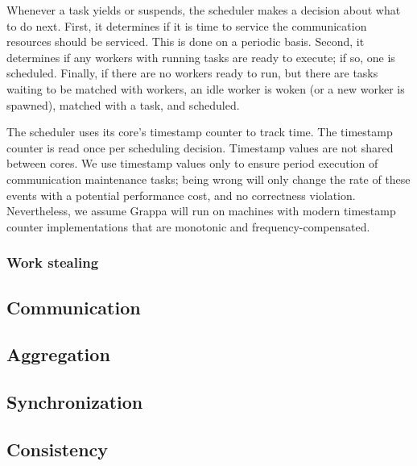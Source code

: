 Whenever a task yields or suspends, the scheduler makes a decision
about what to do next. First, it determines if it is time to service
the communication resources should be serviced. This is done on a
periodic basis. Second, it determines if any workers with running
tasks are ready to execute; if so, one is scheduled. Finally, if there
are no workers ready to run, but there are tasks waiting to be matched
with workers, an idle worker is woken (or a new worker is spawned),
matched with a task, and scheduled.

The scheduler uses its core's timestamp counter to track time. The
timestamp counter is read once per scheduling decision. Timestamp
values are not shared between cores. We use timestamp values only to
ensure period execution of communication maintenance tasks; being
wrong will only change the rate of these events with a potential
performance cost, and no correctness violation. Nevertheless, we
assume Grappa will run on machines with modern timestamp counter
implementations that are monotonic and frequency-compensated.

\subsubsection{Work stealing}


\subsection{Communication}


\subsection{Aggregation}

\subsection{Synchronization}

\subsection{Consistency}
